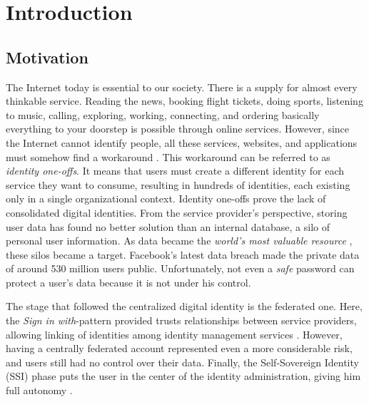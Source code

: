 \chapter{Introduction}
\label{cha:introduction}


\section{Motivation}


The Internet today is essential to our society. There is a supply for almost every thinkable service. Reading the news, booking flight tickets, doing sports, listening to music, calling, exploring, working, connecting, and ordering basically everything to your doorstep is possible through online services. However, since the Internet cannot identify people, all these services, websites, and applications must somehow find a workaround \cite{Tobin_Reed_Windley_Foundation_2017}. This workaround can be referred to as \emph{identity one-offs}. It means that users must create a different identity for each service they want to consume, resulting in hundreds of identities, each existing only in a single organizational context. Identity one-offs prove the lack of consolidated digital identities\cite{macinnis_2019}. From the service provider's perspective, storing user data has found no better solution than an internal database, a silo of personal user information. As data became the \emph{world's most valuable resource} \cite{parkins_2017}, these silos became a target. Facebook's latest data breach made the private data of around 530 million users public\cite{holmes_2021}. Unfortunately, not even a \emph{safe} password can protect a user's data because it is not under his control.

The stage that followed the centralized digital identity is the federated one. Here, the \emph{Sign in with}-pattern provided trusts relationships between service providers, allowing linking of identities among identity management services \cite{1556498}. However, having a centrally federated account represented even a more considerable risk, and users still had no control over their data. Finally, the Self-Sovereign Identity (SSI) phase puts the user in the center of the identity administration, giving him full autonomy \cite{allen_2016}.  

